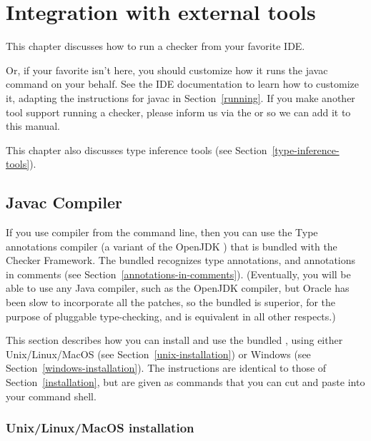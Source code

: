 \htmlhr
\chapter{Integration with external tools\label{external-tools}}

This chapter discusses how to run a checker from your favorite IDE\@.

Or, if your favorite isn't here, you should customize how it runs the
javac command on your behalf.  See the IDE documentation to learn how to
customize it, adapting the instructions for javac in Section~\ref{running}.
If you make another tool support running a checker, please
inform us via the
 or
 so
we can add it to this manual.

This chapter also discusses type inference tools (see
Section~\ref{type-inference-tools}).


\section{Javac Compiler\label{javac-installation}}

If you use  compiler from the command line, then you can use
the Type annotations compiler (a variant of the OpenJDK ) that
is bundled with the Checker Framework.  The bundled  recognizes
type annotations, and annotations in comments (see
Section~\ref{annotations-in-comments}).  (Eventually, you will be able to
use any Java compiler, such as the OpenJDK compiler, but Oracle has been
slow to incorporate all the patches, so the bundled  is
superior, for the purpose of pluggable type-checking, and is equivalent in
all other respects.)

This section describes how you can install and use the bundled
, using either Unix/Linux/MacOS (see
Section~\ref{unix-installation}) or Windows (see
Section~\ref{windows-installation}).
The instructions are identical to those of Section~\ref{installation},
but are given as commands that you can cut and paste into your command shell.



\subsection{Unix/Linux/MacOS installation\label{unix-installation}}

